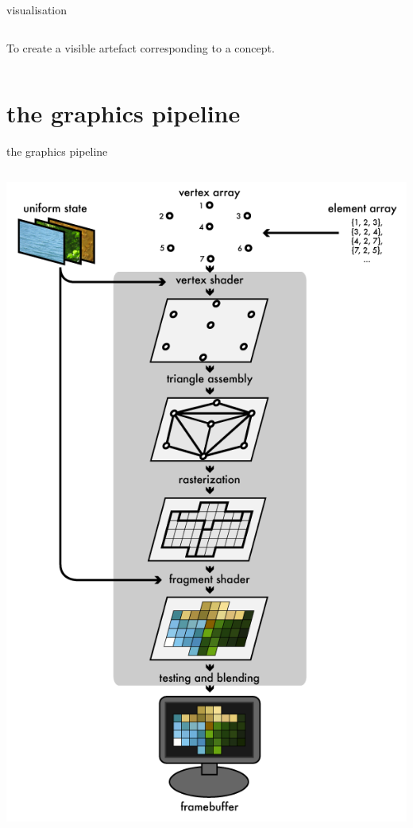 \documentclass[aspectratio=169,xcolor={dvipsnames,svgnames}]{beamer}
\begin{document}
\begin{frame}[label={sec:orgcd4afb0}]{visualisation}
\begin{columns}
\begin{column}{.45\columnwidth}
To create a visible artefact corresponding to a
concept.
\end{column}
\end{columns}
\end{frame}

\section{the graphics pipeline}
\label{sec:org2244030}

\begin{frame}[label={sec:orgea020e3}]{the graphics pipeline}
\begin{columns}
\begin{column}{.3\columnwidth}
\begin{center}
\includegraphics[width=.9\linewidth]{images/gl1-pipeline-01.png}

\end{center}
\end{column}
\end{columns}
\end{frame}
\end{document}

